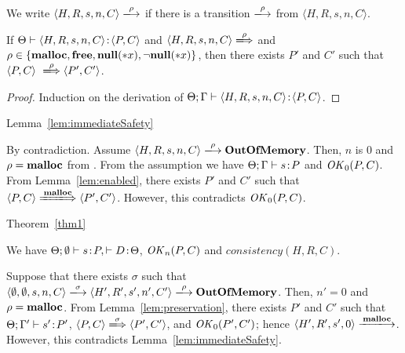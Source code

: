 
We write \(\langle H, R, s, n, C \rangle \xlongrightarrow{\rho}\) if
there is a transition \(\xlongrightarrow{\rho}\) from \(\langle H, R,
s, n, C \rangle\).

\begin{lemma}
\label{lem:enabled}
If \(\Theta \vdash \langle H, R, s, n, C \rangle \!:\! \langle
P,C \rangle\) and \(\langle H, R, s, n, C \rangle
\xLongrightarrow{\rho}\) and \(\rho \in \{\mathbf{malloc}, \mathbf{free}, {\bf null}(*x), \neg{\bf null}(*x)\}\), then
there exists \(P'\) and \(C'\) such that \( \langle P, C \rangle
\ \xLongrightarrow{\rho} \langle P', C'\rangle\).
\end{lemma}

\begin{proof}
Induction on the derivation of \(\Theta; \Gamma \vdash \langle H, R, s, n, C \rangle \!:\! \langle P, C \rangle\).
\end{proof}

\begin{pfof}{Lemma~\ref{lem:immediateSafety}}

By contradiction.  Assume \(\langle H, R, s, n, C \rangle
\xlongrightarrow{\rho} \OVERFLOW\). Then, \(n\) is \(0\) and \(\rho =
\mathbf{malloc} \) from .  From the assumption we have
\(\Theta;\Gamma \vdash s \!:\! P\) and \(\mathit{OK}_0(P, C)\).  From
Lemma~\ref{lem:enabled}, there exists \(P'\) and \(C'\) such that \(
\langle P, C \rangle \xLongrightarrow{\Malloc} \langle P', C'
\rangle\).  However, this contradicts \(\mathit{OK}_0(P, C)\).

\end{pfof}

\begin{pfof}{Theorem~\ref{thm1}}

We have \(\Theta;\emptyset \vdash s\!:\! P, \vdash D\!:\! \Theta\),
\(\mathit{OK}_n(P, C)\) and  \(consistency(H, R, C)\).

Suppose that there exists \(\sigma\) such that \(\langle \emptyset,
\emptyset, s, n, C\rangle \xlongrightarrow{\sigma} \langle H', R', s',
n', C'\rangle \xlongrightarrow{\rho} \OVERFLOW\).  Then, \(n' = 0\)
and \(\rho = \mathbf{malloc} \).  From Lemma~\ref{lem:preservation}, there
exists \(P'\) and \(C'\) such that \(\Theta; \Gamma' \vdash s' \!:\!
P'\), \( \langle P, C \rangle \xLongrightarrow{\sigma} \langle P', C'
\rangle \), and \(\mathit{OK}_0(P', C')\); hence \(\langle H', R', s',
0\rangle \xlongrightarrow{\Malloc}\).  However, this contradicts
Lemma~\ref{lem:immediateSafety}.

\end{pfof}
